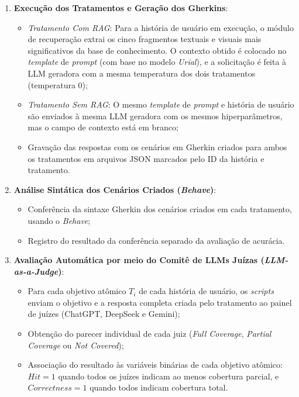 \begin{enumerate}
    \item \textbf{Execução dos Tratamentos e Geração dos Gherkins}:
    \begin{itemize}
        \item \textit{Tratamento Com RAG}: Para a história de usuário em execução, o módulo de recuperação extrai os cinco fragmentos textuais e visuais mais significativos da base de conhecimento. O contexto obtido é colocado no \textit{template} de \textit{prompt} (com base no modelo \textit{Urial}), e a solicitação é feita à LLM geradora com a mesma temperatura dos dois tratamentos (temperatura 0);
        \item \textit{Tratamento Sem RAG}: O mesmo \textit{template} de \textit{prompt} e história de usuário são enviados à mesma LLM geradora com os mesmos hiperparâmetros, mas o campo de contexto está em branco;
        \item Gravação das respostas com os cenários em Gherkin criados para ambos os tratamentos em arquivos JSON marcados pelo ID da história e tratamento.
    \end{itemize}

    \item \textbf{Análise Sintática dos Cenários Criados (\textit{Behave})}:
    \begin{itemize}
        \item Conferência da sintaxe Gherkin dos cenários criados em cada tratamento, usando o \textit{Behave};
        \item Registro do resultado da conferência separado da avaliação de acurácia.
    \end{itemize}

    \item \textbf{Avaliação Automática por meio do Comitê de LLMs Juízas (\textit{LLM-as-a-Judge})}:
    \begin{itemize}
        \item Para cada objetivo atômico $T_i$ de cada história de usuário, os \textit{scripts} enviam o objetivo e a resposta completa criada pelo tratamento ao painel de juízes (ChatGPT, DeepSeek e Gemini);
        \item Obtenção do parecer individual de cada juiz (\textit{Full Coverage}, \textit{Partial Coverage} ou \textit{Not Covered});
        \item Associação do resultado às variáveis binárias de cada objetivo atômico: $Hit = 1$ quando todos os juízes indicam ao menos cobertura parcial, e $Correctness = 1$ quando todos indicam cobertura total.
    \end{itemize}


\end{enumerate}
